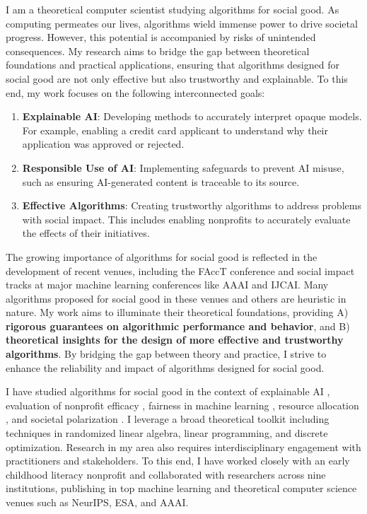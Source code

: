 \documentclass[11pt]{article}
\begin{document}
{\setlength{\parindent}{0cm}

I am a theoretical computer scientist studying algorithms for social good.
As computing permeates our lives, algorithms wield immense power to drive societal progress. However, this potential is accompanied by risks of unintended consequences. My research aims to bridge the gap between theoretical foundations and practical applications, ensuring that algorithms designed for social good are not only effective but also trustworthy and explainable. To this end, my work focuses on the following interconnected goals:
\begin{enumerate}
    \item \textbf{Explainable AI}: Developing methods to accurately interpret opaque models. For example, enabling a credit card applicant to understand why their application was approved or rejected.
    \item \textbf{Responsible Use of AI}: Implementing safeguards to prevent AI misuse, such as ensuring AI-generated content is traceable to its source.
    \item \textbf{Effective Algorithms}: Creating trustworthy algorithms to address problems with social impact. This includes enabling nonprofits to accurately evaluate the effects of their initiatives.
\end{enumerate}

The growing importance of algorithms for social good is reflected in the development of recent venues, including the FAccT conference and social impact tracks at major machine learning conferences like AAAI and IJCAI.
Many algorithms proposed for social good in these venues and others are heuristic in nature. My work aims to illuminate their theoretical foundations, providing A) \textbf{rigorous guarantees on algorithmic performance and behavior}, and B) \textbf{theoretical insights for the design of more effective and trustworthy algorithms}.
By bridging the gap between theory and practice, I strive to enhance the reliability and impact of algorithms designed for social good.

I have studied algorithms for social good in the context of explainable AI \cite{musco2024leverage,liu2024kernel}, evaluation of nonprofit efficacy \cite{witter2024benchmarking}, fairness in machine learning \cite{rosenblatt2023counterfactual,witter2024fairlyuncertain}, resource allocation \cite{hellerstein2022local,witter2024i,witter2024minimizing}, and societal polarization \cite{musco2022quantify}. I leverage a broad theoretical toolkit including techniques in randomized linear algebra, linear programming, and discrete optimization. Research in my area also requires interdisciplinary engagement with practitioners and stakeholders. To this end, I have worked closely with an early childhood literacy nonprofit and collaborated with researchers across nine institutions, publishing in top machine learning and theoretical computer science venues such as NeurIPS, ESA, and AAAI.

}
\end{document}
